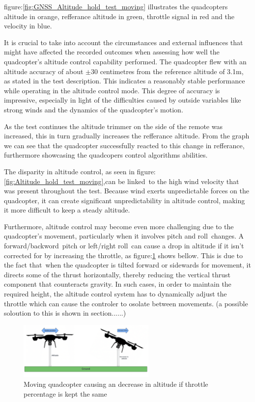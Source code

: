 \documentclass{article}
\begin{document}
figure:\ref{fig:GNSS_Altitude_hold_test_moving} illustrates the quadcopters altitude in orange, refferance altitude in green, throttle signal in red and the velocity in blue.

It is crucial to take into account the circumstances and external influences that might have affected the recorded outcomes when assessing how well the quadcopter's altitude control capability performed. The quadcopter flew with an altitude accuracy of about \(\pm30\) centimetres from the reference altitude of 3.1m, as stated in the test description. 
This indicates a reasonably stable performance while operating in the altitude control mode. This degree of accuracy is impressive, especially in light of the difficulties caused by outside variables like strong winds and the dynamics of the quadcopter's motion.

As the test continues the altitude trimmer on the side of the remote was increased, this in turn gradually increases the refferance altitude. From the graph we can see that the quadcopter successfully reacted to this change in refferance, furthermore showcasing the quadcopers control algorithms abilities.

The disparity in altitude control, as seen in figure:\ref{fig:Altitude_hold_test_moving},can be linked to the high wind velocity that was present throughout the test. Because wind exerts unpredictable forces on the quadcopter, it can create significant unpredictability in altitude control, making it more difficult to keep a steady altitude.

Furthermore, altitude control may become even more challenging due to the quadcopter's movement, particularly when it involves pitch and roll changes. A forward/backword pitch or left/right roll can cause a drop in altitude if it isn't corrected for by increasing the throttle, as figure:\ref{fig:ToF_altitude_error} shows bellow. This is due to the 
fact that when the quadcopter is tilted forward or sidewards for movement, it directs some of the thrust horizontally, thereby reducing the vertical thrust component that counteracts gravity. In such cases, in order to maintain the required height, the altitude control system has to dynamically adjust the throttle which can cause the controler to osolate between movements. (a possible soloution to this is shown in section......)

\begin{figure}[H]
  \centering
  \includegraphics[width=0.6\textwidth]{Pictures/ToF_altitude_error.png}
  \caption{Moving quadcopter causing an decrease in altitude if throttle percentage is kept the same}
  \label{fig:ToF_altitude_error}
\end{figure}
\end{document}
